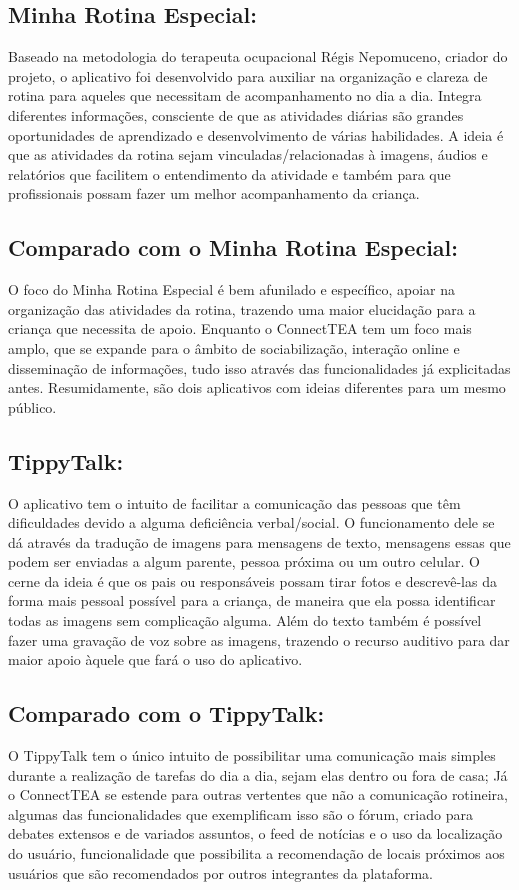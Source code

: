 \begin{apendicesenv}
\subsection{Minha Rotina Especial:}
Baseado na metodologia do terapeuta ocupacional Régis Nepomuceno, criador do projeto, o aplicativo foi desenvolvido para auxiliar na organização e clareza de rotina para aqueles que necessitam de acompanhamento no dia a dia.
Integra diferentes informações, consciente de que as atividades diárias são grandes oportunidades de aprendizado e desenvolvimento de várias habilidades.
A ideia é que as atividades da rotina sejam vinculadas/relacionadas à imagens, áudios e relatórios que facilitem o entendimento da atividade e também para que profissionais possam fazer um melhor acompanhamento da criança.

\subsection{Comparado com o Minha Rotina Especial:}
O foco do Minha Rotina Especial é bem afunilado e específico, apoiar na organização das atividades da rotina, trazendo uma maior elucidação para a criança que necessita de apoio. Enquanto o ConnectTEA tem um foco mais amplo, que se expande para o âmbito de sociabilização, interação online e disseminação de informações, tudo isso através das funcionalidades já explicitadas antes. Resumidamente, são dois aplicativos com ideias diferentes para um mesmo público.


\subsection{TippyTalk:}
O aplicativo tem o intuito de facilitar a comunicação das pessoas que têm dificuldades devido a alguma deficiência verbal/social. O funcionamento dele se dá através da tradução de imagens para mensagens de texto, mensagens essas que podem ser enviadas a algum parente, pessoa próxima ou um outro celular.
O cerne da ideia é que os pais ou responsáveis possam tirar fotos e descrevê-las da forma mais pessoal possível para a criança, de maneira que ela possa identificar todas as imagens sem complicação alguma.
Além do texto também é possível fazer uma gravação de voz sobre as imagens, trazendo o recurso auditivo para dar maior apoio àquele que fará o uso do aplicativo.

\subsection{Comparado com o TippyTalk:}
O TippyTalk tem o único intuito de possibilitar uma comunicação mais simples durante a realização de tarefas do dia a dia, sejam elas dentro ou fora de casa; Já o ConnectTEA se estende para outras vertentes que não a comunicação rotineira, algumas das funcionalidades que exemplificam isso são o fórum, criado para debates extensos e de variados assuntos, o feed de notícias e o uso da localização do usuário, funcionalidade que possibilita a recomendação de locais próximos aos usuários que são recomendados por outros integrantes da plataforma.



\end{apendicesenv}
